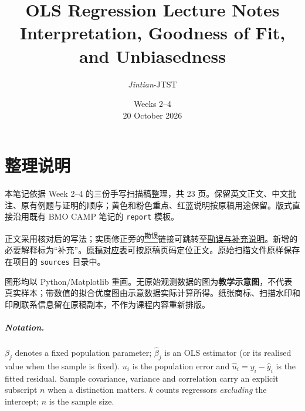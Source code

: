\documentclass[12pt,a4paper,oneside]{report}
\title{\textbf{OLS Regression Lecture Notes}\\[0.5em]\large Interpretation, Goodness of Fit, and Unbiasedness}
\author{\textit{Jintian}-JTST}
\date{Weeks 2--4\\20 October 2026}
\theoremstyle{definition}
\newcommand{\corr}[1]{\unskip\nobreak\hspace{.08em}\hyperref[err:#1]{\textsuperscript{\color{noteRed}\scriptsize 勘误}}}
\begin{document}
\maketitle
{}
\tableofcontents
\clearpage
\chapter*{整理说明}
本笔记依据 Week 2--4 的三份手写扫描稿整理，共 23 页。保留英文正文、中文批注、原有例题与证明的顺序；黄色和粉色重点、红蓝说明按原稿用途保留。版式直接沿用既有 BMO CAMP 笔记的 \texttt{report} 模板。

正文采用核对后的写法；实质修正旁的\corr{notation}链接可跳转至\hyperref[app:errata]{勘误与补充说明}。新增的必要解释标为“补充”。\hyperref[app:sources]{原稿对应表}可按原稿页码定位正文。原始扫描文件原样保存在项目的 \texttt{sources} 目录中。

图形均以 Python/Matplotlib 重画。无原始观测数据的图为\textbf{教学示意图}，不代表真实样本；带数值的拟合优度图由示意数据实际计算所得。纸张商标、扫描水印和印刷联系信息留在原稿副本，不作为课程内容重新排版。

\paragraph{Notation.} $\beta_j$ denotes a fixed population parameter; $\hat\beta_j$ is an OLS estimator (or its realised value when the sample is fixed). $u_i$ is the population error and $\hat u_i=y_i-\hat y_i$ is the fitted residual. Sample covariance, variance and correlation carry an explicit subscript $n$ when a distinction matters. $k$ counts regressors \emph{excluding} the intercept; $n$ is the sample size.

\clearpage
{}
\setcounter{chapter}{1}



\appendix


\end{document}
